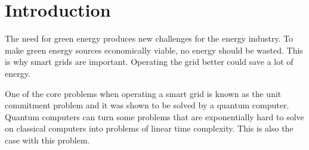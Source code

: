 \section{Introduction}

The need for green energy produces new challenges for the energy industry.
To make green energy sources economically viable, no energy should be wasted.
This is why smart grids are important.
Operating the grid better could save a lot of energy. \cite{Aiello2016}

One of the core problems when operating a smart grid is known as the unit commitment problem
and it was shown to be solved by a quantum computer.
Quantum computers can turn some problems
that are exponentially hard to solve on classical computers
into problems of linear time complexity.
This is also the case with this problem. \cite{Ajagekar2019}
